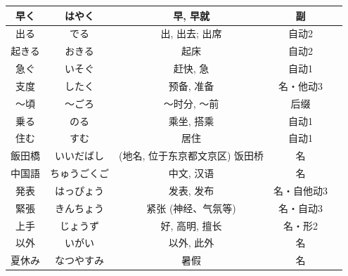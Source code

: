 \begin{longtable}{|c|c|c|c|c|}
早く & はやく & 早, 早就 & 副 & \\ \hline
出る & でる & 出, 出去; 出席 & 自动2 & \\ \hline
起きる & おきる & 起床 & 自动2 & \\ \hline
急ぐ & いそぐ & 赶快, 急 & 自动1 & \\ \hline
支度 & したく & 预备, 准备 & 名・他动3 & \\ \hline
〜頃 & 〜ごろ & 〜时分, 〜前 & 后缀 & \\ \hline
乗る & のる & 乘坐, 搭乘 & 自动1 & \\ \hline
住む & すむ & 居住 & 自动1 & \\ \hline
飯田橋 & いいだばし & (地名, 位于东京都文京区) 饭田桥 & 名 & \\ \hline
中国語 & ちゅうごくご & 中文, 汉语 & 名 & \\ \hline
発表 & はっぴょう & 发表, 发布 & 名・自他动3 & \\ \hline
緊張 & きんちょう & 紧张 (神经、气氛等) & 名・自动3 & \\ \hline
上手 & じょうず & 好, 高明, 擅长 & 名・形2 & \\ \hline
以外 & いがい & 以外, 此外 & 名 & \\ \hline
夏休み & なつやすみ & 暑假 & 名 & \\ \hline
\end{longtable}
